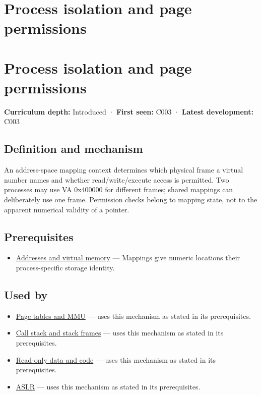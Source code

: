 \hypertarget{appendix-c2a9ad1e2b49}{}
\section*{Process isolation and page permissions}
\section{Process isolation and page permissions}\label{process-isolation-and-page-permissions}

\textbf{Curriculum depth:} Introduced · \textbf{First seen:} C003 · \textbf{Latest development:} C003

\subsection{Definition and mechanism}\label{definition-and-mechanism}

An address-space mapping context determines which physical frame a virtual number names and whether read/write/execute access is permitted. Two processes may use VA 0x400000 for different frames; shared mappings can deliberately use one frame. Permission checks belong to mapping state, not to the apparent numerical validity of a pointer.

\subsection{Prerequisites}\label{prerequisites}

\begin{itemize}
\tightlist
\item
  \hyperref[appendix-18ee4f913c3c]{Addresses and virtual memory} --- Mappings give numeric locations their process-specific storage identity.
\end{itemize}

\subsection{Used by}\label{used-by}

\begin{itemize}
\tightlist
\item
  \hyperref[appendix-01e5905165c4]{Page tables and MMU} --- uses this mechanism as stated in its prerequisites.
\item
  \hyperref[appendix-b081b7abe193]{Call stack and stack frames} --- uses this mechanism as stated in its prerequisites.
\item
  \hyperref[appendix-5f9e5e2f0a5e]{Read-only data and code} --- uses this mechanism as stated in its prerequisites.
\item
  \hyperref[appendix-78cb248c8355]{ASLR} --- uses this mechanism as stated in its prerequisites.
\end{itemize}

